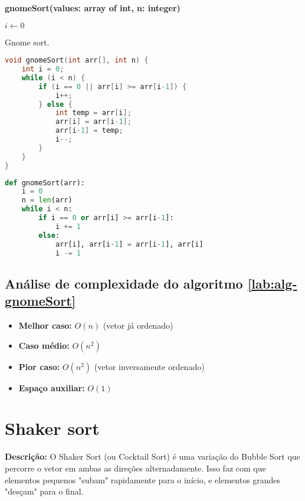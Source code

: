 \begin{center}
\begin{minipage}{.9\linewidth}
\begin{algorithm}[H]
\DontPrintSemicolon
\textbf{gnomeSort(values: array of int, n: integer)}

$i \gets 0$\;
\caption{Gnome sort.}
\label{lab:alg-gnomeSort}
\end{algorithm}
\end{minipage}
\end{center}

\begin{lstlisting}[language=C,caption={Gnome sort em C},captionpos=t]
void gnomeSort(int arr[], int n) {
    int i = 0;
    while (i < n) {
        if (i == 0 || arr[i] >= arr[i-1]) {
            i++;
        } else {
            int temp = arr[i];
            arr[i] = arr[i-1];
            arr[i-1] = temp;
            i--;
        }
    }
}
\end{lstlisting}

\begin{lstlisting}[language=python,caption={Gnome sort em Python},captionpos=t]
def gnomeSort(arr):
    i = 0
    n = len(arr)
    while i < n:
        if i == 0 or arr[i] >= arr[i-1]:
            i += 1
        else:
            arr[i], arr[i-1] = arr[i-1], arr[i]
            i -= 1
\end{lstlisting}

\subsection{Análise de complexidade do algoritmo \ref{lab:alg-gnomeSort}}
\begin{itemize}
    \item \textbf{Melhor caso:} $O(n)$ (vetor já ordenado)
    \item \textbf{Caso médio:} $O(n^2)$
    \item \textbf{Pior caso:} $O(n^2)$ (vetor inversamente ordenado)
    \item \textbf{Espaço auxiliar:} $O(1)$
\end{itemize}


\section{Shaker sort}
\textbf{Descrição:} O Shaker Sort (ou Cocktail Sort) é uma variação do Bubble Sort que percorre o vetor em ambas as direções alternadamente. Isso faz com que elementos pequenos "subam" rapidamente para o início, e elementos grandes "desçam" para o final.

